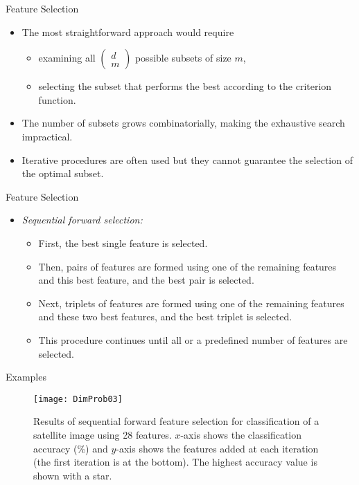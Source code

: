 \begin{frame}{Feature Selection}
\begin{itemize}
\item The most straightforward approach would require
\begin{itemize}
\item examining all $\left( {\begin{array}{*{20}{c}}
d\\
m
\end{array}} \right)$ possible subsets of size $m$,
\item selecting the subset that performs the best according to the criterion function.
\end{itemize}
\item The number of subsets grows combinatorially, making the
exhaustive search impractical.
\item Iterative procedures are often used but they cannot
guarantee the selection of the optimal subset.
\end{itemize}
\end{frame}

\begin{frame}{Feature Selection}
\begin{itemize}
\item \textit{\color{mycolor2}Sequential forward selection:}
\begin{itemize}
\item First, the best single feature is selected.
\item Then, pairs of features are formed using one of the
remaining features and this best feature, and the best pair is
selected.
\item Next, triplets of features are formed using one of the
remaining features and these two best features, and the best
triplet is selected.
\item This procedure continues until all or a predefined number of features are selected.
\end{itemize}
\end{itemize}
\end{frame}

\begin{frame}{Examples}
\begin{figure}
\texttt{[image: DimProb03]}
\caption{Results of sequential forward feature selection for classification of a satellite image using 28 features. $x$-axis shows the classification accuracy (\%) and $y$-axis shows the features added at each iteration (the first iteration is
at the bottom). The highest accuracy value is shown with a star.}
\end{figure}
\end{frame}

